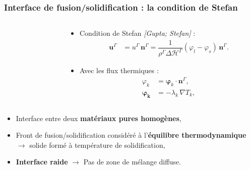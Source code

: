 \documentclass{beamer}
\newcommand{\inte}{\Gamma}
\newcommand{\vect}[1]{\bm{#1}}
\newcommand{\bib}[1]{{\color{cea_texte!80}\tiny\textit{[#1]}}}
\renewcommand{\frac}{\dfrac}
\newcommand{\Frac}{\displaystyle\frac}
\begin{document}
\begin{frame}
    \frametitle{Interface de fusion/solidification : la condition de Stefan}
    \footnotesize
    \begin{columns}[c]
        \begin{column}{0.4\textwidth}
		\begin{tikzpicture}[scale = 0.4, every node/.style={scale=0.4}]
        
		\end{tikzpicture} 
        \end{column}
\footnotesize
	\begin{column}{0.6\textwidth}
			\begin{itemize}
				\item  Condition de Stefan \bib{Gupta; Stefan} :
						\begin{align} \label{eq:Stefan_cond}
						\vect{u}^\inte &= u^\inte \, \vect{n}^\Gamma = \Frac{1}{\rho^{\Gamma} \Delta \mathcal{H}^{\Gamma}} (\varphi_l - \varphi_s) \, \vect{n}^\Gamma.
						\end{align}
				\item Avec les flux thermiques :
						\begin{align} \label{eq:heat_flux}
						\varphi_k&=\vect{\varphi}_k\cdot\vect{n}^\Gamma,\\
						\vect{\varphi_k} &= -\lambda_k \, \nabla T_k,
						\end{align}
			\end{itemize}
        \end{column}
\normalsize
	\end{columns}
	
\begin{itemize}
	\item Interface entre deux \textbf{matériaux pures homogènes},
	\item Front de fusion/solidification considéré à l'\textbf{équilibre thermodynamique} $\rightarrow$ solide formé à température de solidification,
	\item  \textbf{Interface raide}   $\rightarrow$ Pas de zone de mélange diffuse.
\end{itemize}

\end{frame}
\end{document}

